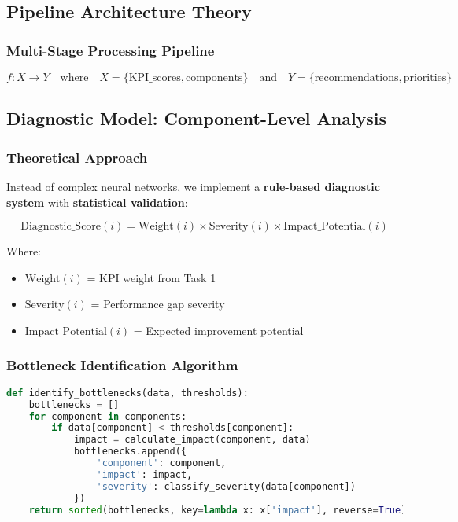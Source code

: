 \documentclass[12pt,a4paper]{article}
\begin{document}
\subsection{Pipeline Architecture Theory}

\subsubsection{Multi-Stage Processing Pipeline}

\begin{equation}
f: X \rightarrow Y \quad \text{where} \quad X = \{\text{KPI\_scores}, \text{components}\} \quad \text{and} \quad Y = \{\text{recommendations}, \text{priorities}\}
\end{equation}

\subsection{Diagnostic Model: Component-Level Analysis}

\subsubsection{Theoretical Approach}

Instead of complex neural networks, we implement a \textbf{rule-based diagnostic system} with \textbf{statistical validation}:

\begin{equation}
\text{Diagnostic\_Score}(i) = \text{Weight}(i) \times \text{Severity}(i) \times \text{Impact\_Potential}(i)
\end{equation}

Where:
\begin{itemize}
\item $\text{Weight}(i)$ = KPI weight from Task 1
\item $\text{Severity}(i)$ = Performance gap severity
\item $\text{Impact\_Potential}(i)$ = Expected improvement potential
\end{itemize}

\subsubsection{Bottleneck Identification Algorithm}

\begin{lstlisting}[language=Python, caption=Bottleneck Identification Algorithm]
def identify_bottlenecks(data, thresholds):
    bottlenecks = []
    for component in components:
        if data[component] < thresholds[component]:
            impact = calculate_impact(component, data)
            bottlenecks.append({
                'component': component,
                'impact': impact,
                'severity': classify_severity(data[component])
            })
    return sorted(bottlenecks, key=lambda x: x['impact'], reverse=True)
\end{lstlisting}
\end{document}
